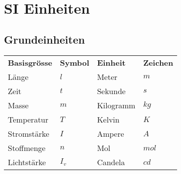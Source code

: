 



\chapter{SI Einheiten}

\section{Grundeinheiten}
\begin{footnotesize}
\begin{tabular}{llll}
  \rowcolor{white} \textbf{Basisgrösse} & \textbf{Symbol} 
                    & \textbf{Einheit} & \textbf{Zeichen}\\
  \rowcolor{lgray} Länge       & $l$   & Meter     & $m$\\
  \rowcolor{white} Zeit        & $t$   & Sekunde   & $s$\\
  \rowcolor{lgray} Masse       & $m$   & Kilogramm & $kg$\\
  \rowcolor{white} Temperatur  & $T$   & Kelvin    & $K$\\
  \rowcolor{lgray} Stromstärke & $I$   & Ampere    & $A$\\
  \rowcolor{white} Stoffmenge  & $n$   & Mol       & $mol$\\
  \rowcolor{lgray} Lichtstärke & $I_v$ & Candela   & $cd$\\
\end{tabular}
\end{footnotesize}

